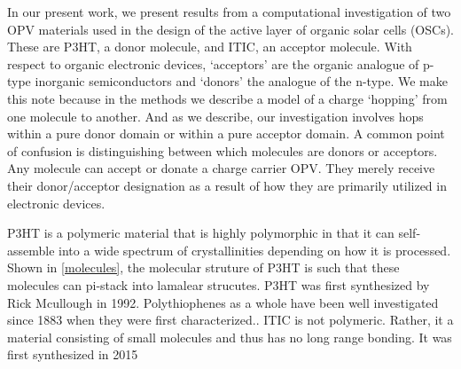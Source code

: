 In our present work, we present results from a computational investigation of two OPV materials
used in the design of the active layer of organic solar cells (OSCs). These are P3HT, a
donor molecule, and ITIC, an acceptor molecule. With respect to organic electronic devices, `acceptors' are the
organic analogue of p-type inorganic semiconductors and `donors' the analogue
of the n-type. We make this note because in the methods we describe a model of
a charge `hopping' from one molecule to another. And as we describe, our
investigation involves hops within a pure donor domain or within a pure
acceptor domain. A common point of confusion is distinguishing between which
molecules are donors or acceptors.
Any molecule can accept or donate a charge carrier OPV.
They merely receive their donor/acceptor designation as a result of how they
are primarily utilized in electronic devices. 

P3HT is a polymeric material that is highly polymorphic in that it can self-assemble into a wide spectrum of
crystallinities depending on how it is processed. Shown in \autoref{molecules}, the molecular struture of P3HT
is such that these molecules can pi-stack into lamalear strucutes. 
P3HT was first synthesized by Rick Mcullough in 1992. Polythiophenes as a whole have been well investigated 
since 1883 when they were first characterized.\cite{Poelking2014}.
ITIC is not polymeric. Rather, it a material consisting of small molecules and thus has no long range bonding.
It was first synthesized in 2015 \cite{Bai201U}


